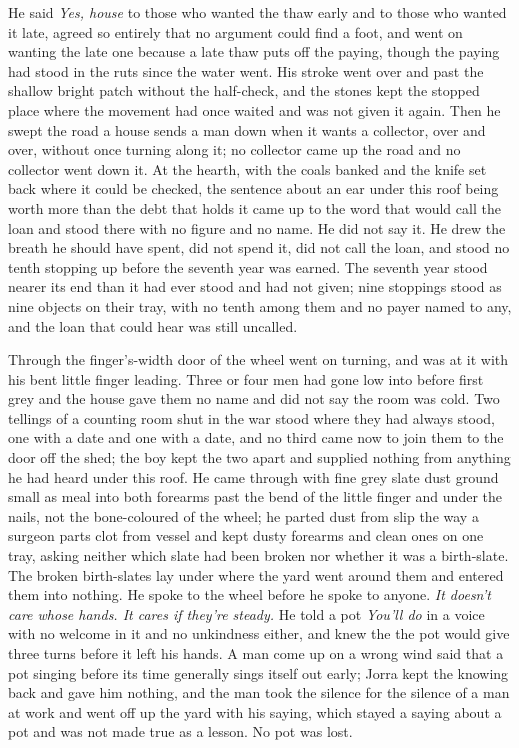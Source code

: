 He said \emph{Yes, house} to those who wanted the thaw early and to those who wanted it late, agreed so entirely that no argument could find a foot, and went on wanting the late one because a late thaw puts off the paying, though the paying had stood in the ruts since the water went. His stroke went over  and past the shallow bright patch without the half-check, and the stones kept the stopped place where the movement had once waited and was not given it again. Then he swept the road a house sends a man down when it wants a collector, over and over, without once turning along it; no collector came up the road and no collector went down it. At the hearth, with the coals banked and the knife set back where it could be checked, the sentence about an ear under this roof being worth more than the debt that holds it came up to the word that would call the loan and stood there with no figure and no name. He did not say it. He drew the breath he should have spent, did not spend it, did not call the loan, and stood no tenth stopping up before the seventh year was earned. The seventh year stood nearer its end than it had ever stood and had not given; nine stoppings stood as nine objects on their tray, with no tenth among them and no payer named to any, and the loan that could hear was still uncalled.

\scenebreak

Through the finger's-width door of  the wheel went on turning, and  was at it with his bent little finger leading. Three or four men had gone low into  before first grey and the house gave them no name and did not say the room was cold. Two tellings of a counting room shut in the war stood where they had always stood, one with a date and one with a date, and no third came now to join them to the door off the shed; the boy kept the two apart and supplied nothing from anything he had heard under this roof. He came through with fine grey slate dust ground small as meal into both forearms past the bend of the little finger and under the nails, not the bone-coloured  of the wheel; he parted dust from slip the way a surgeon parts clot from vessel and kept dusty forearms and clean ones on one tray, asking neither which slate had been broken nor whether it was a birth-slate. The broken birth-slates lay under  where the yard went around them and entered them into nothing. He spoke to the wheel before he spoke to anyone. \emph{It doesn't care whose hands. It cares if they're steady.} He told a pot \emph{You'll do} in a voice with no welcome in it and no unkindness either, and knew the  the pot would give three turns before it left his hands. A man come up on a wrong wind said that a pot singing before its time generally sings itself out early; Jorra kept the knowing back and gave him nothing, and the man took the silence for the silence of a man at work and went off up the yard with his saying, which stayed a saying about a pot and was not made true as a lesson. No pot was lost.


